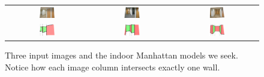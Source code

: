 \documentclass{article}
\begin{document}
\begin{figure}[tb]%
  \centering
  \label{fig:ideal-models}
  \begin{tabular}{ccc}
    \includegraphics[width=0.2\textwidth]{figures/true_models/lab_ground1_010_rect.png} &
    \includegraphics[width=0.2\textwidth]{figures/true_models/lab_kitchen_030_rect.png} &
    \includegraphics[width=0.2\textwidth]{figures/true_models/lab_ground1_030_rect.png} \\
    \includegraphics[width=0.2\textwidth]{figures/true_models/lab_ground1_010} &
    \includegraphics[width=0.2\textwidth]{figures/true_models/lab_kitchen_030} &
    \includegraphics[width=0.2\textwidth]{figures/true_models/lab_ground1_030}
  \end{tabular}
  \hspace{0.2cm}
  \caption{Three input images and the indoor Manhattan models we
    seek. Notice how each image column intersects exactly one
    wall.}
\end{figure}
\end{document}
